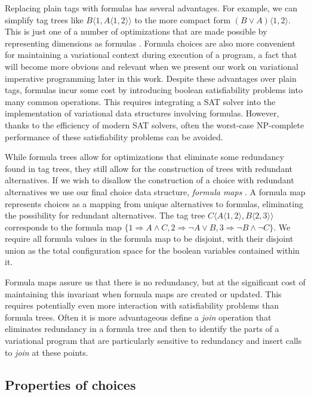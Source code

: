 \documentclass[letterpaper,10pt,onecolumn]{article}
\newcommand{\tagtree}[3]{#1 \langle #2, #3 \rangle}
\begin{document}
Replacing plain tags with formulas has several advantages. For example, we can simplify tag trees like
$\tagtree{B}{1}{\tagtree{A}{1}{2}}$ to the more compact form $\tagtree{(B \vee A)}{1}{2}$. This is just
one of a number of optimizations that are made possible by representing dimensions as formulas
\cite{walkingshaw2014projectional,hubbard2016formula}. Formula choices are also more convenient
for maintaining a variational context during execution of a program, a fact that will become
more obvious and relevant when we present our work on variational imperative programming later in
this work. Despite these advantages over plain tags, formulas incur some cost by introducing boolean
satisfiability problems into many common operations. This requires integrating a SAT solver into the
implementation of variational data structures involving formulas. However, thanks to the
efficiency of modern SAT solvers, often the worst-case NP-complete performance of these satisfiability
problems can be avoided.

While formula trees allow for optimizations that eliminate some redundancy found in tag trees,
they still allow for the construction of trees with redundant alternatives. If we wish to disallow the
construction of a choice with redundant alternatives we use our final choice data structure,
\emph{formula maps} \cite{walkingshaw2014variational}.
A formula map represents choices as a mapping from unique alternatives to formulas, eliminating the
possibility for redundant alternatives. The tag tree $\tagtree{C}{\tagtree{A}{1}{2}}{\tagtree{B}{2}{3}}$
corresponds to the formula map 
$\{1 \Rightarrow A \wedge C, 2 \Rightarrow \neg A \vee B, 3 \Rightarrow \neg B \wedge \neg C\}$.
We require all formula values in the formula map to be disjoint, with their disjoint union as the total
configuration space for the boolean variables contained within it. %

Formula maps assure us that there is no redundancy, but at the significant cost of maintaining this
invariant when formula maps are created or updated. This requires potentially even more interaction
with satisfiability problems than formula trees. Often it is more advantageous define a \emph{join}
operation that eliminates redundancy in a formula tree and then to identify the parts of
a variational program that are particularly sensitive to redundancy and insert calls to \emph{join}
at these points.  

\subsection{Properties of choices}
\end{document}
